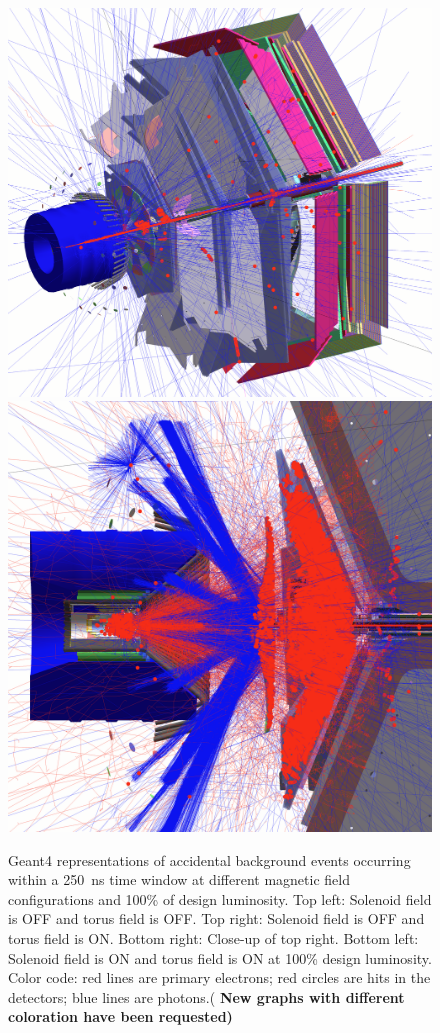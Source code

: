 \documentclass[final,3p,twocolumn]{elsarticle}
\begin{document}
\begin{figure}[htbp!]
{}
\vspace{0.3cm}
\centerline{
	\includegraphics[width=1.0\columnwidth, height=1.0\columnwidth]{FullSolenoidFullTorus.png}
	\includegraphics[width=1.0\columnwidth, height=1.0\columnwidth]{NoSolenoidFullTorusCut2.png}
}
\caption{Geant4 representations of accidental background events occurring within a 250~ns time window at
  different magnetic field configurations and 100\% of design luminosity. Top left: Solenoid field is OFF and
  torus field is OFF. Top right: Solenoid field is OFF and torus field is ON. Bottom right: Close-up of top right.
  Bottom left: Solenoid field is ON and torus field is ON at 100\% design luminosity. Color code: red lines are
  primary electrons; red circles are hits in the detectors; blue lines are photons.( {\bf New graphs with different 
  coloration have been requested)}}
  

\end{figure}
\end{document}

